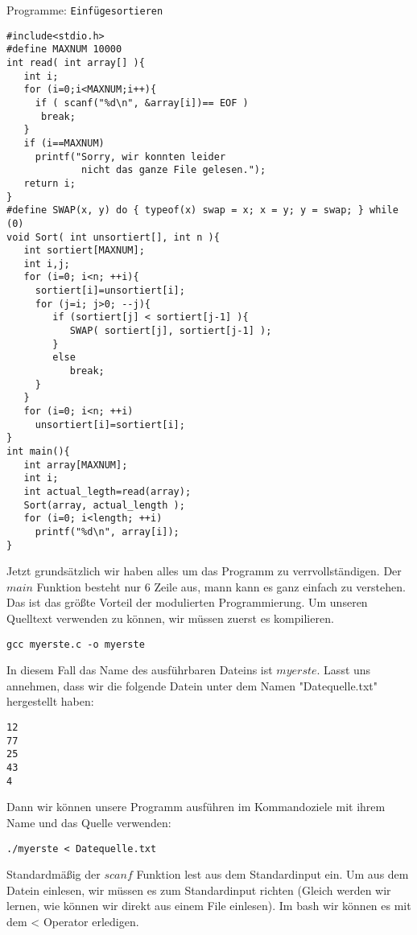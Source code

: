 \begin{myexampleprogram}{ Programme: \texttt{Einfügesortieren}}
\begin{lstlisting}
#include<stdio.h>
#define MAXNUM 10000
int read( int array[] ){
   int i;
   for (i=0;i<MAXNUM;i++){
     if ( scanf("%d\n", &array[i])== EOF )
      break;
   }
   if (i==MAXNUM)
     printf("Sorry, wir konnten leider
             nicht das ganze File gelesen.");
   return i;
}
#define SWAP(x, y) do { typeof(x) swap = x; x = y; y = swap; } while (0)
void Sort( int unsortiert[], int n ){
   int sortiert[MAXNUM];
   int i,j;
   for (i=0; i<n; ++i){
     sortiert[i]=unsortiert[i];
     for (j=i; j>0; --j){
        if (sortiert[j] < sortiert[j-1] ){
           SWAP( sortiert[j], sortiert[j-1] );
        }
        else
           break;
     }
   }
   for (i=0; i<n; ++i)
     unsortiert[i]=sortiert[i];
}
int main(){
   int array[MAXNUM];
   int i;
   int actual_legth=read(array);
   Sort(array, actual_length );
   for (i=0; i<length; ++i)
     printf("%d\n", array[i]); 
}
\end{lstlisting}
Jetzt grundsätzlich wir haben alles um das Programm zu verrvollständigen.
Der $main$ Funktion besteht nur 6 Zeile aus, mann kann es ganz einfach zu verstehen. Das
ist das größte Vorteil der modulierten Programmierung. Um unseren Quelltext verwenden zu können,
wir müssen zuerst es kompilieren.
\begin{lstlisting}
gcc myerste.c -o myerste
\end{lstlisting}
In diesem Fall das Name des ausführbaren Dateins ist $myerste$. Lasst uns annehmen, dass wir die folgende Datein 
unter dem Namen "Datequelle.txt" 
hergestellt haben:
\begin{lstlisting}
12
77
25
43
4
\end{lstlisting}
Dann wir können unsere Programm ausführen im Kommandoziele mit ihrem Name und das Quelle verwenden:
\begin{lstlisting}
./myerste < Datequelle.txt
\end{lstlisting}
Standardmäßig der $scanf$ Funktion lest aus dem Standardinput ein. Um aus dem Datein einlesen, wir müssen es
zum Standardinput richten  (Gleich werden wir lernen, wie können wir direkt aus einem File einlesen). Im bash 
wir können es mit dem < Operator erledigen.
\end{myexampleprogram}
